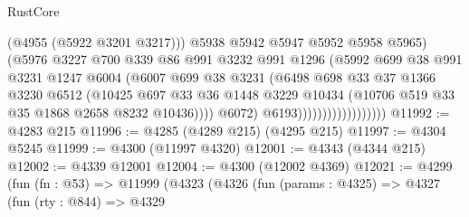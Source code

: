 \begin{lexlean}{RustCore}
\begin{coremodule}
                                          (@4955 (@5922 @3201 @3217)))
                                        @5938
                                        @5942
                                        @5947
                                        @5952
                                        @5958
                                        @5965)
                                      (@5976
                                        @3227
                                        @700
                                        @339
                                        @86
                                        @991
                                        @3232
                                        @991
                                        @1296
                                        (@5992
                                          @699
                                          @38
                                          @991
                                          @3231
                                          @1247
                                          @6004
                                          (@6007
                                            @699
                                            @38
                                            @3231
                                            (@6498
                                              @698
                                              @33
                                              @37
                                              @1366
                                              @3230
                                              @6512
                                              (@10425
                                                @697
                                                @33
                                                @36
                                                @1448
                                                @3229
                                                @10434
                                                (@10706 @519 @33 @35 @1868 @2658 @8232 @10436))))
                                          @6072)
                                        @6193))))))))))))))))))
@11992 := @4283 @215
@11996 := @4285 (@4289 @215) (@4295 @215)
@11997 := @4304 @5245
@11999 := @4300 (@11997 @4320)
@12001 := @4343 (@4344 @215)
@12002 := @4339 @12001
@12004 := @4300 (@12002 @4369)
@12021 := @4299
    (fun (fn : @53) =>
    @11999
      (@4323
        (@4326
          (fun (params : @4325) =>
          @4327
            (fun (rty : @844) =>
            @4329

\end{coremodule}
\end{lexlean}
